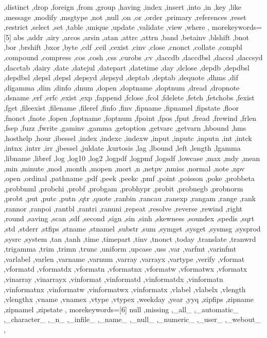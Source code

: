 {{    ,distinct ,drop ,foreign ,from ,group ,having ,index ,insert ,into
    ,in ,key ,like ,message ,modify ,msgtype ,not ,null ,on ,or ,order
    ,primary ,references ,reset ,restrict ,select ,set ,table ,unique
    ,update ,validate ,view ,where
  },
  morekeywords=[5]{
    abs ,addr ,airy ,arcos ,arsin ,atan ,attrc ,attrn ,band ,betainv
    ,blshift ,bnot ,bor ,brshift ,bxor ,byte ,cdf ,ceil ,cexist ,cinv
    ,close ,cnonct ,collate ,compbl ,compound ,compress ,cos ,cosh ,css
    ,curobs ,cv ,daccdb ,daccdbsl ,daccsl ,daccsyd ,dacctab ,dairy
    ,date ,datejul ,datepart ,datetime ,day ,dclose ,depdb ,depdbsl
    ,depdbsl ,depsl ,depsl ,depsyd ,depsyd ,deptab ,deptab ,dequote
    ,dhms ,dif ,digamma ,dim ,dinfo ,dnum ,dopen ,doptname ,doptnum
    ,dread ,dropnote ,dsname ,erf ,erfc ,exist ,exp ,fappend ,fclose
    ,fcol ,fdelete ,fetch ,fetchobs ,fexist ,fget ,fileexist ,filename
    ,fileref ,finfo ,finv ,fipname ,fipnamel ,fipstate ,floor ,fnonct
    ,fnote ,fopen ,foptname ,foptnum ,fpoint ,fpos ,fput ,fread ,frewind
    ,frlen ,fsep ,fuzz ,fwrite ,gaminv ,gamma ,getoption ,getvarc
    ,getvarn ,hbound ,hms ,hosthelp ,hour ,ibessel ,index ,indexc
    ,indexw ,input ,inputc ,inputn ,int ,intck ,intnx ,intrr ,irr
    ,jbessel ,juldate ,kurtosis ,lag ,lbound ,left ,length ,lgamma
    ,libname ,libref ,log ,log10 ,log2 ,logpdf ,logpmf ,logsdf ,lowcase
    ,max ,mdy ,mean ,min ,minute ,mod ,month ,mopen ,mort ,n ,netpv
    ,nmiss ,normal ,note ,npv ,open ,ordinal ,pathname ,pdf ,peek ,peekc
    ,pmf ,point ,poisson ,poke ,probbeta ,probbnml ,probchi ,probf
    ,probgam ,probhypr ,probit ,probnegb ,probnorm ,probt ,put ,putc
    ,putn ,qtr ,quote ,ranbin ,rancau ,ranexp ,rangam ,range ,rank
    ,rannor ,ranpoi ,rantbl ,rantri ,ranuni ,repeat ,resolve ,reverse
    ,rewind ,right ,round ,saving ,scan ,sdf ,second ,sign ,sin ,sinh
    ,skewness ,soundex ,spedis ,sqrt ,std ,stderr ,stfips ,stname
    ,stnamel ,substr ,sum ,symget ,sysget ,sysmsg ,sysprod ,sysrc
    ,system ,tan ,tanh ,time ,timepart ,tinv ,tnonct ,today ,translate
    ,tranwrd ,trigamma ,trim ,trimn ,trunc ,uniform ,upcase ,uss ,var
    ,varfmt ,varinfmt ,varlabel ,varlen ,varname ,varnum ,varray
    ,varrayx ,vartype ,verify ,vformat ,vformatd ,vformatdx ,vformatn
    ,vformatnx ,vformatw ,vformatwx ,vformatx ,vinarray ,vinarrayx
    ,vinformat ,vinformatd ,vinformatdx ,vinformatn ,vinformatnx
    ,vinformatw ,vinformatwx ,vinformatx ,vlabel ,vlabelx ,vlength
    ,vlengthx ,vname ,vnamex ,vtype ,vtypex ,weekday ,year ,yyq ,zipfips
    ,zipname ,zipnamel ,zipstate
  },
  morekeywords=[6]{
    null ,missing ,_all_ ,_automatic_ ,_character_ ,_n_ ,_infile_
    ,_name_ ,_null_ ,_numeric_ ,_user_ ,_webout_
  },
}

